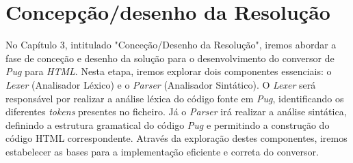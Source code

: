 \documentclass[11pt,a4paper]{report}%
\begin{document}
\chapter{Concepção/desenho da Resolução}

No Capítulo 3, intitulado "Conceção/Desenho da Resolução", iremos abordar a fase de conceção e desenho da solução para o desenvolvimento do conversor de \textit{Pug} para \textit{HTML}. Nesta etapa, iremos explorar dois componentes essenciais: o \textit{Lexer} (Analisador Léxico) e o \textit{Parser} (Analisador Sintático). O \textit{Lexer} será responsável por realizar a análise léxica do código fonte em \textit{Pug}, identificando os diferentes \textit{tokens} presentes no ficheiro. Já o \textit{Parser} irá realizar a análise sintática, definindo a estrutura gramatical do código \textit{Pug} e permitindo a construção do código HTML correspondente. Através da exploração destes componentes, iremos estabelecer as bases para a implementação eficiente e correta do conversor.
\end{document}
